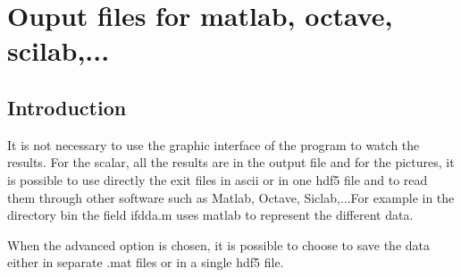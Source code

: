 \chapter{Ouput files for matlab, octave,
  scilab,...}\label{chap7}

\minitoc

\section{Introduction}

It is not necessary to use the graphic interface of the program to
watch the results. For the scalar, all the results are in the output
file and for the pictures, it is possible to use directly the exit
files in ascii or in one hdf5 file and to read them through other
software such as Matlab, Octave, Siclab,...For example in the
directory bin the field ifdda.m uses matlab to represent the different
data.


When the advanced option is chosen, it is possible to choose to save
the data either in separate .mat files or in a single hdf5 file.


